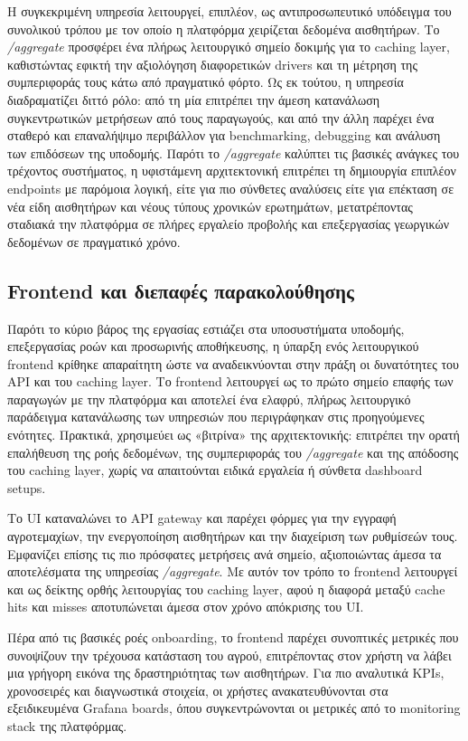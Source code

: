 Η συγκεκριμένη υπηρεσία λειτουργεί, επιπλέον, ως αντιπροσωπευτικό υπόδειγμα του
συνολικού τρόπου με τον οποίο η πλατφόρμα χειρίζεται δεδομένα αισθητήρων. Το
\textit{/aggregate} προσφέρει ένα πλήρως λειτουργικό σημείο δοκιμής για το
caching layer, καθιστώντας εφικτή την αξιολόγηση διαφορετικών drivers και τη
μέτρηση της συμπεριφοράς τους κάτω από πραγματικό φόρτο. Ως εκ τούτου, η
υπηρεσία διαδραματίζει διττό ρόλο: από τη μία επιτρέπει την άμεση κατανάλωση
συγκεντρωτικών μετρήσεων από τους παραγωγούς, και από την άλλη παρέχει ένα
σταθερό και επαναλήψιμο περιβάλλον για benchmarking, debugging και ανάλυση των
επιδόσεων της υποδομής. Παρότι το \textit{/aggregate} καλύπτει τις βασικές
ανάγκες του τρέχοντος συστήματος, η υφιστάμενη αρχιτεκτονική επιτρέπει τη
δημιουργία επιπλέον endpoints με παρόμοια λογική, είτε για πιο σύνθετες
αναλύσεις είτε για επέκταση σε νέα είδη αισθητήρων και νέους τύπους χρονικών
ερωτημάτων, μετατρέποντας σταδιακά την πλατφόρμα σε πλήρες εργαλείο προβολής
και επεξεργασίας γεωργικών δεδομένων σε πραγματικό χρόνο.

\subsection{Frontend και διεπαφές παρακολούθησης}

Παρότι το κύριο βάρος της εργασίας εστιάζει στα υποσυστήματα υποδομής,
επεξεργασίας ροών και προσωρινής αποθήκευσης, η ύπαρξη ενός λειτουργικού
frontend κρίθηκε απαραίτητη ώστε να αναδεικνύονται στην πράξη οι δυνατότητες
του API και του caching layer. Το frontend λειτουργεί ως το πρώτο σημείο επαφής
των παραγωγών με την πλατφόρμα και αποτελεί ένα ελαφρύ, πλήρως λειτουργικό
παράδειγμα κατανάλωσης των υπηρεσιών που περιγράφηκαν στις προηγούμενες
ενότητες. Πρακτικά, χρησιμεύει ως «βιτρίνα» της αρχιτεκτονικής: επιτρέπει την
ορατή επαλήθευση της ροής δεδομένων, της συμπεριφοράς του \textit{/aggregate}
και της απόδοσης του caching layer, χωρίς να απαιτούνται ειδικά εργαλεία ή
σύνθετα dashboard setups.

Το UI καταναλώνει το API gateway και παρέχει φόρμες για την εγγραφή
αγροτεμαχίων, την ενεργοποίηση αισθητήρων και την διαχείριση των ρυθμίσεών
τους. Εμφανίζει επίσης τις πιο πρόσφατες μετρήσεις ανά σημείο, αξιοποιώντας
άμεσα τα αποτελέσματα της υπηρεσίας \textit{/aggregate}. Με αυτόν τον τρόπο το
frontend λειτουργεί και ως δείκτης ορθής λειτουργίας του caching layer, αφού η
διαφορά μεταξύ cache hits και misses αποτυπώνεται άμεσα στον χρόνο απόκρισης
του UI.

Πέρα από τις βασικές ροές onboarding, το frontend παρέχει συνοπτικές μετρικές
που συνοψίζουν την τρέχουσα κατάσταση του αγρού, επιτρέποντας στον χρήστη να
λάβει μια γρήγορη εικόνα της δραστηριότητας των αισθητήρων. Για πιο αναλυτικά
KPIs, χρονοσειρές και διαγνωστικά στοιχεία, οι χρήστες ανακατευθύνονται στα
εξειδικευμένα Grafana boards, όπου συγκεντρώνονται οι μετρικές από το
monitoring stack της πλατφόρμας.

